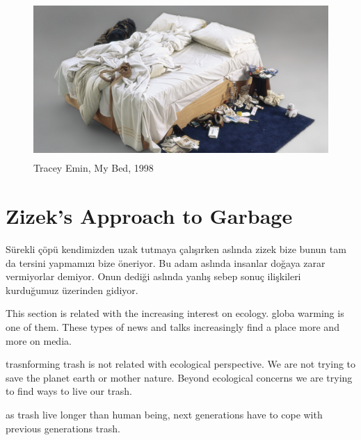 \begin{figure}[h!]
  \centering
  \includegraphics[height=6cm]{graphics/tracey-emin-my-bed.jpg}
  \caption{Tracey Emin, My Bed, 1998}
  \label{fig:TraceyEmin_MyBed}
\end{figure}

 


\section{Zizek's Approach to Garbage}
Sürekli çöpü kendimizden uzak tutmaya çalışırken aslında zizek bize bunun tam da tersini yapmamızı bize öneriyor. Bu adam aslında insanlar doğaya zarar vermiyorlar demiyor. Onun dediği aslında yanlış sebep sonuç ilişkileri kurduğumuz üzerinden gidiyor.

This section is related with the increasing interest on ecology. globa warming is one of them. These types of news and talks increasingly find a place more and more on media. 

trasnforming trash is not related with ecological perspective. We are not trying to save the planet earth or mother nature. Beyond ecological concerns we are trying to find ways to live our trash. 

as trash live longer than human being, next generations have to cope with previous generations trash. 

